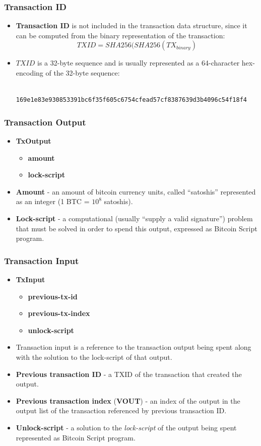 \documentclass{beamer}
\begin{document}
\begin{frame}[fragile]
  \frametitle{Transaction ID}
  \begin{itemize}
  \item \textbf{Transaction ID} is not included in the transaction data
    structure, since it can be computed from the binary representation of the
    transaction:
    $$TXID = SHA256(SHA256(TX_{binary})$$
  \item $TXID$ is a 32-byte sequence and is usually represented as a
    64-character hex-encoding of the 32-byte sequence:
    \begin{verbatim}
      169e1e83e930853391bc6f35f605c6754cfead57cf8387639d3b4096c54f18f4
    \end{verbatim}
  \end{itemize}
\end{frame}

\begin{frame}
  \frametitle{Transaction Output}
  \begin{itemize}
  \item \textbf{TxOutput}
    \begin{itemize}
    \item \textbf{amount}
    \item \textbf{lock-script}
    \end{itemize}
  \item \textbf{Amount} - an amount of bitcoin currency units, called
    ``satoshis'' represented as an integer (1 BTC = $10^8$ satoshis).
  \item \textbf{Lock-script} - a computational (usually ``supply a valid
    signature'') problem that must be solved in order to spend this output,
    expressed as Bitcoin Script program.
  \end{itemize}
\end{frame}

\begin{frame}
  \frametitle{Transaction Input}
  \begin{itemize}
  \item \textbf{TxInput}
    \begin{itemize}
    \item \textbf{previous-tx-id}
    \item \textbf{previous-tx-index}
    \item \textbf{unlock-script}
    \end{itemize}
  \item Transaction input is a reference to the transaction output being spent
    along with the solution to the lock-script of that output.
  \item \textbf{Previous transaction ID} - a TXID of the transaction that
    created the output.
  \item \textbf{Previous transaction index} (\textbf{VOUT}) - an index of the
    output in the output list of the transaction referenced by previous
    transaction ID.
  \item \textbf{Unlock-script} - a solution to the \textit{lock-script} of the
    output being spent represented as Bitcoin Script program.
  \end{itemize}
\end{frame}
\end{document}
